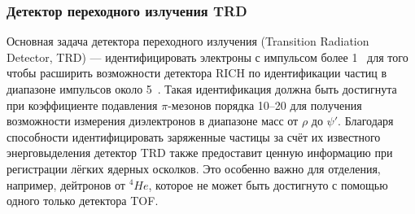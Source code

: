 
\subsubsection{Детектор переходного излучения TRD}\label{sec:secTRD}

Основная задача детектора переходного излучения (Transition Radiation Detector, TRD) --- идентифицировать электроны с импульсом более 1~\GeVoverC{} для того чтобы расширить возможности детектора RICH по идентификации частиц в диапазоне импульсов около 5~\GeVoverC{}.
Такая идентификация должна быть достигнута при коэффициенте подавления $\pi$-мезонов порядка 10--20 для получения возможности измерения диэлектронов в диапазоне масс от $\rho$ до $\psi'$.
Благодаря способности идентифицировать заряженные частицы за счёт их известного энерговыделения детектор TRD также предоставит ценную информацию при регистрации лёгких ядерных осколков.
Это особенно важно для отделения, например, дейтронов от $ ^{4}He $, которое не может быть достигнуто с помощью одного только детектора TOF.


